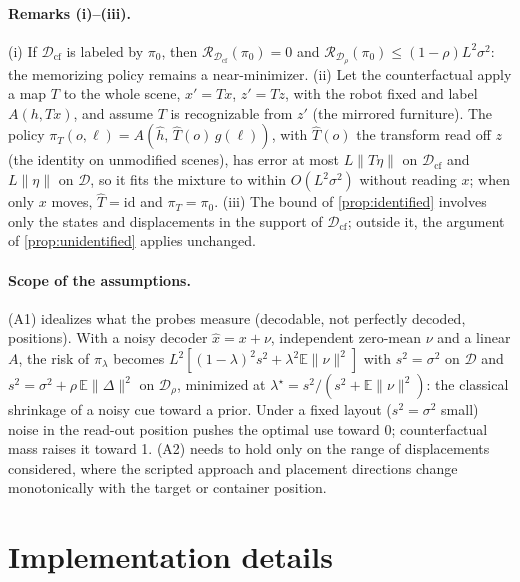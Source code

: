 \paragraph{Remarks (i)--(iii).}
(i) If $\mathcal{D}_{\text{cf}}$ is labeled by $\pi_0$, then $\mathcal{R}_{\mathcal{D}_{\text{cf}}}(\pi_0)=0$ and
$\mathcal{R}_{\mathcal{D}_\rho}(\pi_0)\le(1-\rho)L^2\sigma^2$: the memorizing policy remains a near-minimizer.
(ii) Let the counterfactual apply a map $T$ to the whole scene, $x'=Tx$, $z'=Tz$, with the robot fixed and label
$A(h,Tx)$, and assume $T$ is recognizable from $z'$ (\eg the mirrored furniture). The policy
$\pi_T(o,\ell)=A(\hat h,\,\hat T(o)\,g(\ell))$, with $\hat T(o)$ the transform read off $z$ (the identity on unmodified
scenes), has error at most $L\lVert T\eta\rVert$ on $\mathcal{D}_{\text{cf}}$ and $L\lVert\eta\rVert$ on $\mathcal{D}$, so
it fits the mixture to within $O(L^2\sigma^2)$ without reading $x$; when only $x$ moves, $\hat T=\mathrm{id}$ and
$\pi_T=\pi_0$. (iii) The bound of \cref{prop:identified} involves only the states and displacements in the support of
$\mathcal{D}_{\text{cf}}$; outside it, the argument of \cref{prop:unidentified} applies unchanged.

\paragraph{Scope of the assumptions.}
(A1) idealizes what the probes measure (decodable, not perfectly decoded, positions). With a noisy decoder
$\hat x=x+\nu$, independent zero-mean $\nu$ and a linear $A$, the risk of $\pi_\lambda$ becomes
$L^2[(1-\lambda)^2 s^2+\lambda^2\mathbb{E}\lVert\nu\rVert^2]$ with $s^2=\sigma^2$ on $\mathcal{D}$ and
$s^2=\sigma^2+\rho\,\mathbb{E}\lVert\Delta\rVert^2$ on $\mathcal{D}_\rho$, minimized at
$\lambda^\star=s^2/(s^2+\mathbb{E}\lVert\nu\rVert^2)$: the classical shrinkage of a noisy cue toward a prior. Under a
fixed layout ($s^2=\sigma^2$ small) noise in the read-out position pushes the optimal use toward 0; counterfactual mass
raises it toward 1.
(A2) needs to hold only on the range of displacements considered, where the scripted approach and placement directions
change monotonically with the target or container position.

\section{Implementation details}
\label{sec:supp:impl}

